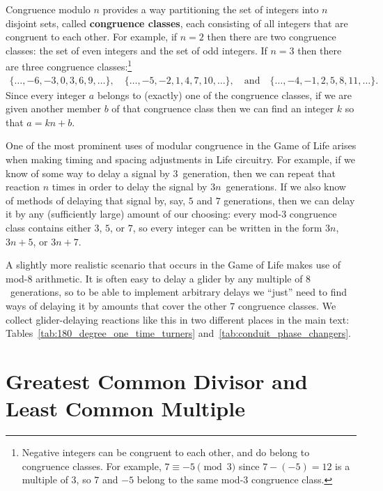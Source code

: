 Congruence modulo $n$ provides a way partitioning the set of integers into $n$ disjoint sets, called \textbf{congruence classes}, each consisting of all integers that are congruent to each other. For example, if $n = 2$ then there are two congruence classes: the set of even integers and the set of odd integers. If $n = 3$ then there are three congruence classes:\footnote{Negative integers can be congruent to each other, and do belong to congruence classes. For example, $7 \equiv -5 \pmod{3}$ since $7-(-5) = 12$ is a multiple of $3$, so $7$ and $-5$ belong to the same mod-$3$ congruence class.}
\begin{align*}
	\{\ldots, -6, -3, 0, 3, 6, 9, \ldots\}, \quad \{\ldots, -5, -2, 1, 4, 7, 10, \ldots\}, \quad \text{and} \quad \{\ldots, -4, -1, 2, 5, 8, 11, \ldots\}.
\end{align*}
Since every integer $a$ belongs to (exactly) one of the congruence classes, if we are given another member $b$ of that congruence class then we can find an integer $k$ so that $a = kn + b$.

One of the most prominent uses of modular congruence in the Game of Life arises when making timing and spacing adjustments in Life circuitry. For example, if we know of some way to delay a signal by $3$~generation, then we can repeat that reaction $n$ times in order to delay the signal by $3n$~generations. If we also know of methods of delaying that signal by, say, $5$ and $7$ generations, then we can delay it by any (sufficiently large) amount of our choosing: every mod-$3$ congruence class contains either $3$, $5$, or $7$, so every integer can be written in the form $3n$, $3n + 5$, or $3n + 7$.

A slightly more realistic scenario that occurs in the Game of Life makes use of mod-$8$ arithmetic. It is often easy to delay a glider by any multiple of $8$~generations, so to be able to implement arbitrary delays we ``just'' need to find ways of delaying it by amounts that cover the other $7$ congruence classes. We collect glider-delaying reactions like this in two different places in the main text: Tables~\ref{tab:180_degree_one_time_turners} and~\ref{tab:conduit_phase_changers}.


\section{Greatest Common Divisor and Least Common Multiple}\label{sec:gcd}

